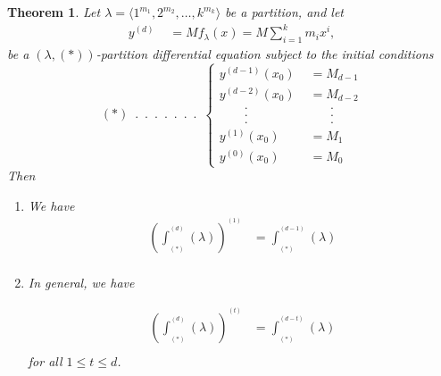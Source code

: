 \documentclass[11pt]{amsart}
\newtheorem{theorem}{Theorem}[section]
\theoremstyle{remark}
\theoremstyle{definition}
\theoremstyle{remark}
\numberwithin{equation}{section}
\begin{document}
\begin{theorem}\label{thm.p.d.e.1}
Let $\lambda=\langle1^{m_1},2^{m_2},\dots,k^{m_k}\rangle$ be a partition, and let 
\begin{align}
	y^{(d)}	& \,\, =  M f_\lambda(x)= M \sum_{i=1}^{k}  m_i x^{i},
\end{align}	
be a $(\lambda,(*))$-partition differential equation subject to the initial conditions
\begin{equation*}
	(*)   \,\,\, . \,\,\, . \,\,\, . \,\,\, . \,\,\, . \,\,\, . \,\,\, . \,\,\,
	\begin{cases}
		y^{(d-1)}(x_0)	& \,\, = M_{d-1} \\
		y^{(d-2)}(x_0)	& \,\, =  M_{d-2}\\
		\quad \quad .	& \quad \quad . \\
		\quad \quad .	& \quad \quad . \\
		\quad \quad .	& \quad \quad . \\
		y^{(1)}(x_0)	& \,\, =  M_1\\
		y^{(0)}(x_0)	& \,\, = M_0 
	\end{cases}       
\end{equation*}
Then 
\begin{enumerate}[label=(\roman*)]
	\item We have 
	\begin{equation*}	\begin{aligned}\label{sequence11113}
			\left( \int^{\!^{(d)}}_{\!_{(*)}} (\lambda) \right)^{\!^{(1)}}
			&=	 \int^{\!^{(d-1)}}_{\!_{(*)}} (\lambda) \\
		\end{aligned}	
	\end{equation*} 
	\item In general, we have 
	
	\begin{equation}
		\begin{aligned}\label{sequence11114}
			\left( \int^{\!^{(d)}}_{\!_{(*)}} (\lambda) \right)^{\!^{(t)}}
			&= \int^{\!^{(d-t)}}_{\!_{(*)}} (\lambda)\\
		\end{aligned}	
	\end{equation} 
	for all $1 \leq t \leq d$.
\end{enumerate}
\end{theorem}
\end{document}
